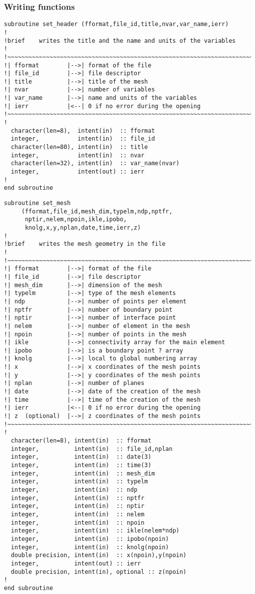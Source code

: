 \subsubsection{Writing functions}
%
\begin{lstlisting}
subroutine set_header (fformat,file_id,title,nvar,var_name,ierr)
!
!brief    writes the title and the name and units of the variables
!
!~~~~~~~~~~~~~~~~~~~~~~~~~~~~~~~~~~~~~~~~~~~~~~~~~~~~~~~~~~~~~~~~~~~~~~~
!| fformat        |-->| format of the file
!| file_id        |-->| file descriptor
!| title          |-->| title of the mesh
!| nvar           |-->| number of variables
!| var_name       |-->| name and units of the variables
!| ierr           |<--| 0 if no error during the opening
!~~~~~~~~~~~~~~~~~~~~~~~~~~~~~~~~~~~~~~~~~~~~~~~~~~~~~~~~~~~~~~~~~~~~~~~
!
  character(len=8),  intent(in)  :: fformat
  integer,           intent(in)  :: file_id
  character(len=80), intent(in)  :: title
  integer,           intent(in)  :: nvar
  character(len=32), intent(in)  :: var_name(nvar)
  integer,           intent(out) :: ierr
!
end subroutine
\end{lstlisting}
%
\begin{lstlisting}
subroutine set_mesh
     (fformat,file_id,mesh_dim,typelm,ndp,nptfr,
      nptir,nelem,npoin,ikle,ipobo,
      knolg,x,y,nplan,date,time,ierr,z)
!
!brief    writes the mesh geometry in the file
!
!~~~~~~~~~~~~~~~~~~~~~~~~~~~~~~~~~~~~~~~~~~~~~~~~~~~~~~~~~~~~~~~~~~~~~~~
!| fformat        |-->| format of the file
!| file_id        |-->| file descriptor
!| mesh_dim       |-->| dimension of the mesh
!| typelm         |-->| type of the mesh elements
!| ndp            |-->| number of points per element
!| nptfr          |-->| number of boundary point
!| nptir          |-->| number of interface point
!| nelem          |-->| number of element in the mesh
!| npoin          |-->| number of points in the mesh
!| ikle           |-->| connectivity array for the main element
!| ipobo          |-->| is a boundary point ? array
!| knolg          |-->| local to global numbering array
!| x              |-->| x coordinates of the mesh points
!| y              |-->| y coordinates of the mesh points
!| nplan          |-->| number of planes
!| date           |-->| date of the creation of the mesh
!| time           |-->| time of the creation of the mesh
!| ierr           |<--| 0 if no error during the opening
!| z  (optional)  |-->| z coordinates of the mesh points
!~~~~~~~~~~~~~~~~~~~~~~~~~~~~~~~~~~~~~~~~~~~~~~~~~~~~~~~~~~~~~~~~~~~~~~~
!
  character(len=8), intent(in)  :: fformat
  integer,          intent(in)  :: file_id,nplan
  integer,          intent(in)  :: date(3)
  integer,          intent(in)  :: time(3)
  integer,          intent(in)  :: mesh_dim
  integer,          intent(in)  :: typelm
  integer,          intent(in)  :: ndp
  integer,          intent(in)  :: nptfr
  integer,          intent(in)  :: nptir
  integer,          intent(in)  :: nelem
  integer,          intent(in)  :: npoin
  integer,          intent(in)  :: ikle(nelem*ndp)
  integer,          intent(in)  :: ipobo(npoin)
  integer,          intent(in)  :: knolg(npoin)
  double precision, intent(in)  :: x(npoin),y(npoin)
  integer,          intent(out) :: ierr
  double precision, intent(in), optional :: z(npoin)
!
end subroutine
\end{lstlisting}
